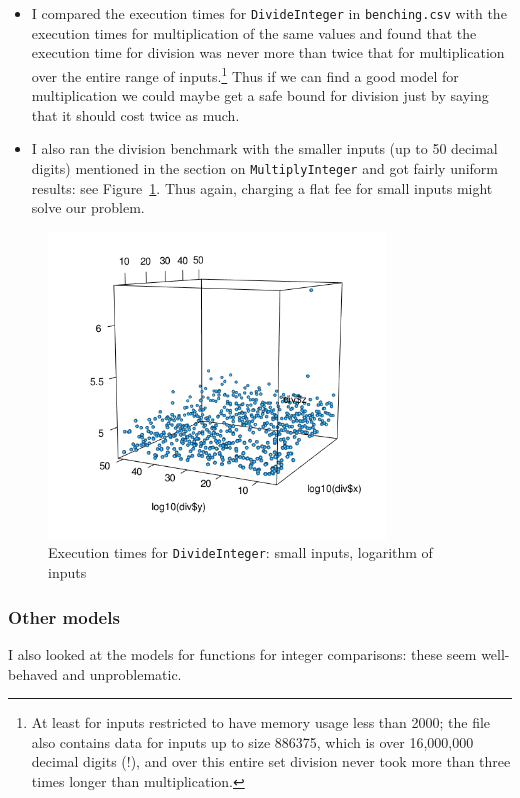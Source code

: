 \documentclass[a4paper]{article}
\begin{document}
\begin{itemize}
\item  I compared the execution times for \verb|DivideInteger| in
  \verb|benching.csv| with the execution times for multiplication of
  the same values and found that the execution time for division was
  never more than twice that for multiplication over the entire range
  of inputs.\footnote{At least for inputs restricted to have memory
    usage less than 2000; the file also contains data for inputs up to
    size 886375, which is over 16,000,000 decimal digits (!), and over this entire
    set division never took more than three times longer than
    multiplication.}
  Thus if we can find a good model for multiplication we could maybe get a safe bound
  for division just by saying that it should cost twice as much.
\item I also ran the division benchmark with the smaller inputs (up to
  50 decimal digits) mentioned in the section on
  \verb|MultiplyInteger| and got fairly uniform results: see
  Figure~\ref{fig:div-plot-small}. Thus again, charging a flat fee for small
  inputs might solve our problem.
  
\end{itemize}

\begin{figure}
\centering
  \includegraphics[width=0.8\textwidth]{figures/div-plot-small.png}
  \caption{Execution times for \texttt{DivideInteger}: small inputs, logarithm of inputs}
  \label{fig:div-plot-small}
\end{figure}

\subsubsection*{Other models}
I also looked at the models for functions for integer comparisons:
these seem well-behaved and unproblematic.
\end{document}
